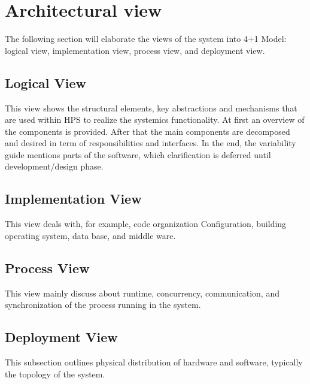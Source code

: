 \section{Architectural view}
The following section will elaborate the views of the system into 4+1 Model: logical view, implementation view, process view, and deployment view.

\subsection{Logical View}
This view shows the structural elements, key abstractions and mechanisms that are used within HPS to realize the systemics functionality. At first an overview of the components is provided. After that the main components are decomposed and desired in term of responsibilities and interfaces. In the end, the variability guide mentions parts of the software, which clarification is deferred until development/design phase.

\subsection{Implementation View}
This view deals with, for example, code organization Configuration, building operating system, data base, and middle ware.

\subsection{Process View}
This view mainly discuss about runtime, concurrency, communication, and synchronization of the process running in the system.

\subsection{Deployment View}
This subsection outlines physical distribution of hardware and software, typically the topology of the system.